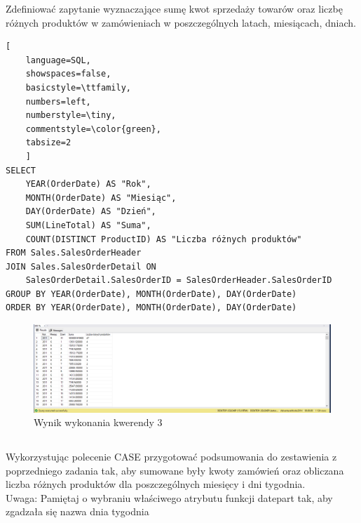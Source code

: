 \documentclass[a4paper,12pt]{article}
\begin{document}
Zdefiniować zapytanie wyznaczające sumę kwot sprzedaży towarów oraz liczbę różnych produktów w zamówieniach w poszczególnych latach, miesiącach, dniach.

\begin{lstlisting}[
    language=SQL,
    showspaces=false,
    basicstyle=\ttfamily,
    numbers=left,
    numberstyle=\tiny,
    commentstyle=\color{green},
    tabsize=2
    ]
SELECT 
    YEAR(OrderDate) AS "Rok", 
    MONTH(OrderDate) AS "Miesiąc", 
    DAY(OrderDate) AS "Dzień", 
    SUM(LineTotal) AS "Suma", 
    COUNT(DISTINCT ProductID) AS "Liczba różnych produktów"
FROM Sales.SalesOrderHeader
JOIN Sales.SalesOrderDetail ON 
    SalesOrderDetail.SalesOrderID = SalesOrderHeader.SalesOrderID
GROUP BY YEAR(OrderDate), MONTH(OrderDate), DAY(OrderDate)
ORDER BY YEAR(OrderDate), MONTH(OrderDate), DAY(OrderDate)
\end{lstlisting}

\begin{figure}[H]
    \centering
    \includegraphics[width=1.0\textwidth]{images/03.png}
    \caption{Wynik wykonania kwerendy 3}
\end{figure}

\subsection{}

Wykorzystując polecenie CASE przygotować podsumowania do zestawienia z poprzedniego zadania tak, aby sumowane były kwoty zamówień oraz obliczana liczba różnych produktów dla poszczególnych miesięcy i dni tygodnia.\\
Uwaga: Pamiętaj o wybraniu właściwego atrybutu funkcji datepart tak, aby zgadzała się nazwa dnia tygodnia
\end{document}
